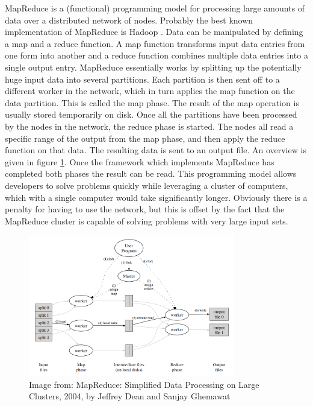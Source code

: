 MapReduce is a (functional) programming model for processing large amounts of
data over a distributed network of nodes. Probably the best known implementation
of MapReduce is Hadoop \cite{Hadoop}. Data can be manipulated by defining a map
and a reduce function. A map function transforms input data entries from one form into another
and a reduce function combines multiple data entries into a single output entry.
MapReduce essentially works by splitting up the potentially huge input data into
several partitions. Each partition is then sent off to a different worker in the
network, which in turn applies the map function on the data partition. This is
called the map phase. The result of the map operation is usually stored
temporarily on disk. Once all the partitions have been processed by the nodes in
the network, the reduce phase is started. The nodes all read a specific range of
the output from the map phase, and then apply the reduce function on that data.
The resulting data is sent to an output file. An overview is given in figure
\ref{fig:mapreduce}. Once the framework which implements MapReduce has completed
both phases the result can be read. This programming model allows developers to
solve problems quickly while leveraging a cluster of computers, which with a
single computer would take significantly longer. Obviously there is a penalty
for having to use the network, but this is offset by the fact that the
MapReduce cluster is capable of solving problems with very large input sets.

\begin{figure}[htb] 
\includegraphics[width=340px]{mapreduce.png} 
\caption{Image from: MapReduce: Simplified Data Processing on Large Clusters, 2004, by Jeffrey Dean and Sanjay Ghemawat} \label{fig:mapreduce} 
\end{figure}
